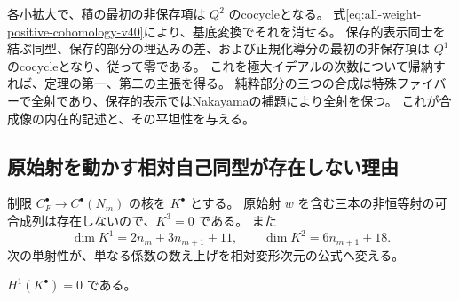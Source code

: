 各小拡大で、積の最初の非保存項は $Q^2$ のcocycleとなる。
式\eqref{eq:all-weight-positive-cohomology-v40}により、基底変換でそれを消せる。
保存的表示同士を結ぶ同型、保存的部分の埋込みの差、および正規化導分の最初の非保存項は
$Q^1$ のcocycleとなり、従って零である。
これを極大イデアルの次数について帰納すれば、定理の第一、第二の主張を得る。
純粋部分の三つの合成は特殊ファイバーで全射であり、保存的表示ではNakayamaの補題により全射を保つ。
これが合成像の内在的記述と、その平坦性を与える。

\subsection{原始射を動かす相対自己同型が存在しない理由}

制限 $C_F^\bullet\to C^\bullet(N_m)$ の核を $K^\bullet$ とする。
原始射 $w$ を含む三本の非恒等射の可合成列は存在しないので、$K^3=0$ である。
また
\begin{equation}
 \dim K^1=2n_m+3n_{m+1}+11,
 \qquad \dim K^2=6n_{m+1}+18.
 \label{eq:all-weight-relative-dimensions-v40}
\end{equation}
次の単射性が、単なる係数の数え上げを相対変形次元の公式へ変える。

\begin{lemma}[全共鳴での原始射の無限小安定化群]
\label{lem:all-weight-relative-stabilizer-v40}
$H^1(K^\bullet)=0$ である。
\end{lemma}

